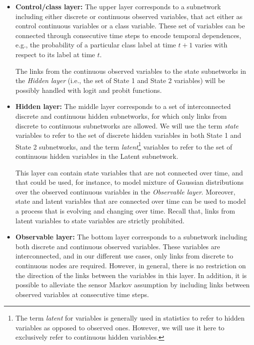 \begin{itemize}

\item \textbf{Control/class layer:} The upper layer corresponds to a subnetwork including either discrete or continuous observed variables, that act either as control continuous variables or a class variable. These set of variables can be connected through consecutive time steps to encode temporal dependences, e.g., the probability of a particular class label at time $t+1$ varies with respect to its label at time $t$. 

The links from the continuous observed variables to the state subnetworks in the \textit{Hidden layer} (i.e., the set of State 1 and State 2 variables) will be possibly handled with logit and probit functions.

\item \textbf{Hidden layer:}  The middle layer corresponds to a set of interconnected discrete and continuous hidden subnetworks, for which only links from discrete to continuous subnetworks are allowed. We will use the term \textit{state} variables to refer to the set of discrete hidden variables in both State 1 and State 2 subnetworks, and the term \textit{latent}\footnote{The term \textit{latent} for variables is generally used in statistics to refer to hidden variables as opposed to observed ones. However, we will use it here to exclusively refer to continuous hidden variables.} variables to refer to the set of continuous hidden variables in the Latent subnetwork.

This layer can contain state variables that are not connected over time, and that could be used, for instance, to model mixture of Gaussian distributions over the observed continuous variables in the \textit{Observable layer}. Moreover, state and latent variables that are connected over time can be used to model a process that is evolving and changing over time. Recall that, links from latent variables to state variables are strictly prohibited.

\item \textbf{Observable layer:} The bottom layer corresponds to a subnetwork including both discrete and continuous observed variables. These variables are interconnected, and in our different use cases, only links from discrete to continuous nodes are required. However, in general, there is no restriction on the direction of the links between the variables in this layer. In addition, it is possible to alleviate the sensor Markov assumption by including links between observed variables at consecutive time steps.

\end{itemize} 

